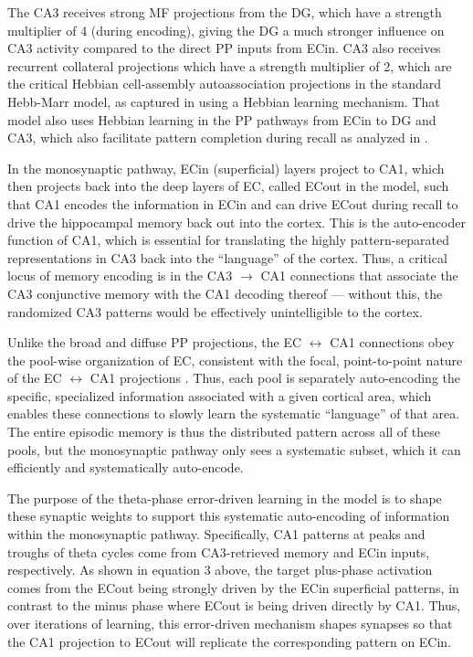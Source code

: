 \documentclass[11pt,twoside]{article}
\newif\myifpdf
\begin{document}
The CA3 receives strong MF projections from the DG, which have a strength multiplier of 4 (during encoding), giving the DG a much stronger influence on CA3 activity compared to the direct PP inputs from ECin.  CA3 also receives recurrent collateral projections which have a strength multiplier of 2, which are the critical Hebbian cell-assembly autoassociation projections in the standard Hebb-Marr model, as captured in \cite{KetzMorkondaOReilly13} using a Hebbian learning mechanism.  That model also uses Hebbian learning in the PP pathways from ECin to DG and CA3, which also facilitate pattern completion during recall as analyzed in \citet{OReillyMcClelland94}.

In the monosynaptic pathway, ECin (superficial) layers project to CA1, which then projects back into the deep layers of EC, called ECout in the model, such that CA1 encodes the information in ECin and can drive ECout during recall to drive the hippocampal memory back out into the cortex.  This is the auto-encoder function of CA1, which is essential for translating the highly pattern-separated representations in CA3 back into the ``language'' of the cortex.  Thus, a critical locus of memory encoding is in the CA3 $\rightarrow$ CA1 connections that associate the CA3 conjunctive memory with the CA1 decoding thereof --- without this, the randomized CA3 patterns would be effectively unintelligible to the cortex.

Unlike the broad and diffuse PP projections, the EC $\leftrightarrow$ CA1 connections obey the pool-wise organization of EC, consistent with the focal, point-to-point nature of the EC $\leftrightarrow$ CA1 projections \citep{WitterDoanJacobsenEtAl17}.  Thus, each pool is separately auto-encoding the specific, specialized information associated with a given cortical area, which enables these connections to slowly learn the systematic ``language'' of that area.  The entire episodic memory is thus the distributed pattern across all of these pools, but the monosynaptic pathway only sees a systematic subset, which it can efficiently and systematically auto-encode.

The purpose of the theta-phase error-driven learning in the \citet{KetzMorkondaOReilly13} model is to shape these synaptic weights to support this systematic auto-encoding of information within the monosynaptic pathway.  Specifically, CA1 patterns at peaks and troughs of theta cycles come from CA3-retrieved memory and ECin inputs, respectively.  As shown in equation 3 above, the target plus-phase activation comes from the ECout being strongly driven by the ECin superficial patterns, in contrast to the minus phase where ECout is being driven directly by CA1.  Thus, over iterations of learning, this error-driven mechanism shapes synapses so that the CA1 projection to ECout will replicate the corresponding pattern on ECin.
\end{document}
